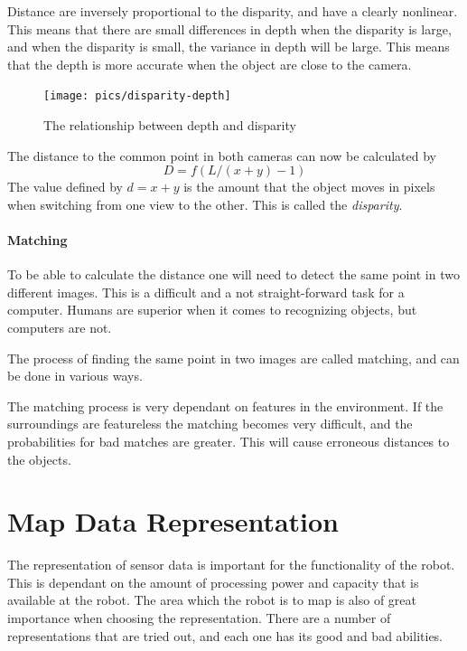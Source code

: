     Distance are inversely proportional to the disparity, and have a clearly nonlinear.
    This means that there are small differences in depth when the disparity is large, and
    when the disparity is small, the variance in depth will be large. This means that the
    depth is more accurate when the object are close to the camera. 
    \begin{figure}[htbp]
        \centering
        \texttt{[image: pics/disparity-depth]}
        \caption{The relationship between depth and disparity}
        \label{fig:chap2-disparity-depth}
    \end{figure}


    

    The distance to the common point in both cameras can now be calculated by 
    \begin{equation}
        D = f (L / (x+y) - 1)
    \end{equation}
    The value defined by $d = x+y$ is the amount that the object moves in pixels when
    switching from one view to the other. This is called the \emph{disparity}.


\paragraph{Matching}
    To be able to calculate the distance one will need to detect the same point in two
    different images. This is a difficult and a not straight-forward task for a computer.
    Humans are superior when it comes to recognizing objects, but computers are not.

    The process of finding the same point in two images are called matching, and can be
    done in various ways. \cite{gonzalez}

    The matching process is very dependant on features in the environment. If the
    surroundings are featureless the matching becomes very difficult, and the
    probabilities for bad matches are greater. This will cause erroneous distances to the
    objects.






\section{Map Data Representation}
The representation of sensor data is important for the functionality of the robot. This is
dependant on the amount of processing power and capacity that is available at the robot.
The area which the robot is to map is also of great importance when choosing the
representation. There are a number of representations that are tried out, and each one has its good and
bad abilities. 

